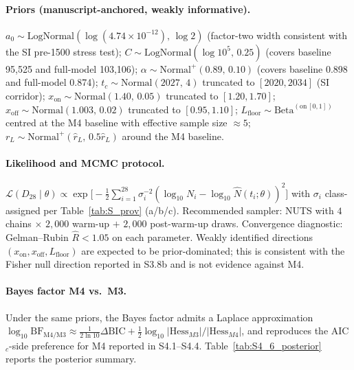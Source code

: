 \documentclass[11pt]{article}
\begin{document}
\paragraph{Priors (manuscript-anchored, weakly informative).}
$a_0\sim\mathrm{LogNormal}(\log(4.74{\times}10^{-12}),\,\log 2)$ (factor-two width consistent with the SI pre-1500 stress test);
$C\sim\mathrm{LogNormal}(\log 10^{5},\,0.25)$ (covers baseline 95{,}525 and full-model 103{,}106);
$\alpha\sim\mathrm{Normal}^{+}(0.89,\,0.10)$ (covers baseline 0.898 and full-model 0.874);
$t_c\sim\mathrm{Normal}(2027,\,4)$ truncated to $[2020,2034]$ (SI corridor);
$x_{\mathrm{on}}\sim\mathrm{Normal}(1.40,\,0.05)$ truncated to $[1.20,1.70]$;
$x_{\mathrm{off}}\sim\mathrm{Normal}(1.003,\,0.02)$ truncated to $[0.95,1.10]$;
$L_{\mathrm{floor}}\sim\mathrm{Beta}^{(\mathrm{on}\,[0,1])}$ centred at the M4 baseline with effective sample size $\approx 5$;
$r_L\sim\mathrm{Normal}^{+}(\hat r_L,\,0.5\hat r_L)$ around the M4 baseline.

\paragraph{Likelihood and MCMC protocol.}
$\mathcal L(D_{28}\mid\theta)\propto\exp\!\bigl[-\tfrac{1}{2}\sum_{i=1}^{28}\sigma_i^{-2}(\log_{10}N_i-\log_{10}\hat N(t_i;\theta))^{2}\bigr]$ with $\sigma_i$ class-assigned per Table~\ref{tab:S_prov} (a/b/c).  Recommended sampler: NUTS with $4$ chains $\times$ $2{,}000$ warm-up $+$ $2{,}000$ post-warm-up draws.  Convergence diagnostic: Gelman--Rubin $\hat R<1.05$ on each parameter.  Weakly identified directions $(x_{\mathrm{on}},x_{\mathrm{off}},L_{\mathrm{floor}})$ are expected to be prior-dominated; this is consistent with the Fisher null direction reported in S3.8b and is not evidence against M4.

\paragraph{Bayes factor M4 vs.\ M3.}
Under the same priors, the Bayes factor admits a Laplace approximation $\log_{10}\mathrm{BF}_{\mathrm{M4/M3}}\approx\tfrac{1}{2\ln 10}\Delta\mathrm{BIC}+\tfrac{1}{2}\log_{10}|\mathrm{Hess}_{M3}|/|\mathrm{Hess}_{M4}|$, and reproduces the AIC$_c$-side preference for M4 reported in S4.1--S4.4.  Table~\ref{tab:S4_6_posterior} reports the posterior summary.
\end{document}
